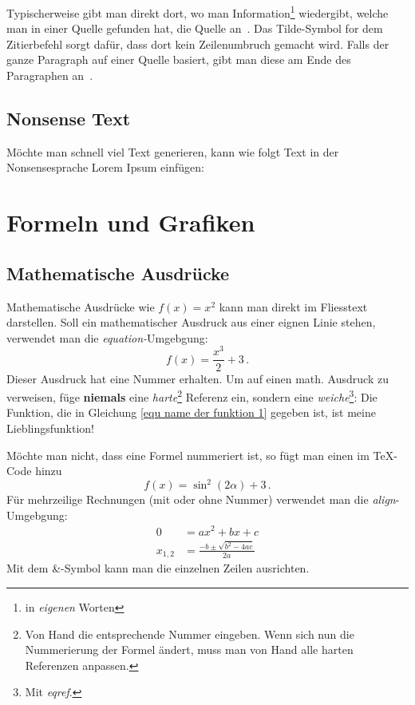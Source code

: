 \documentclass[a4paper,12pt,twoside]{article}
\begin{document}
Typischerweise gibt man direkt dort, wo man Information\footnote{in \textit{eigenen} Worten} wiedergibt, welche man in einer Quelle gefunden hat, die Quelle an~\cite{Aabkabla2019}. Das Tilde-Symbol for dem Zitierbefehl sorgt dafür, dass dort kein Zeilenumbruch gemacht wird. Falls der ganze Paragraph auf einer Quelle basiert, gibt man diese am Ende des Paragraphen an~\cite{Lamport1986,Ellwanger2015}.

\subsection{Nonsense Text}

Möchte man schnell viel Text generieren, kann wie folgt Text in der Nonsensesprache Lorem Ipsum einfügen:

\lipsum[1]

\section{Formeln und Grafiken}

\subsection{Mathematische Ausdrücke}

Mathematische Ausdrücke wie $f(x) = x^2$ kann man direkt im Fliesstext darstellen. Soll ein mathematischer Ausdruck aus einer eignen Linie stehen, verwendet man die \textit{equation-}Umgebgung:
\begin{equation}
	\label{equ name der funktion 1} %
	f(x) = \frac{x^3}{2} + 3 \,. %
\end{equation}
Dieser Ausdruck hat eine Nummer erhalten. Um auf einen math. Ausdruck zu verweisen, füge \textbf{niemals} eine \textit{harte}\footnote{Von Hand die entsprechende Nummer eingeben. Wenn sich nun die Nummerierung der Formel ändert, muss man von Hand alle harten Referenzen anpassen.} Referenz ein, sondern eine \textit{weiche}\footnote{Mit \textit{eqref}.}:
Die Funktion, die in Gleichung \eqref{equ name der funktion 1} gegeben ist, ist meine Lieblingsfunktion!

Möchte man nicht, dass eine Formel nummeriert ist, so fügt man einen \* im TeX-Code hinzu
\begin{equation*}
f(x) = \sin^2{(2\alpha)} + 3 \,.
\end{equation*}
Für mehrzeilige Rechnungen (mit oder ohne Nummer) verwendet man die \textit{align}-Umgebgung:
\begin{align*}
	0 &= ax^2 + bx + c \\
	x_{1,2} &= \frac{-b \pm \sqrt{b^2 - 4ac}}{2a}
\end{align*}
Mit dem \&-Symbol kann man die einzelnen Zeilen ausrichten.
\end{document}
